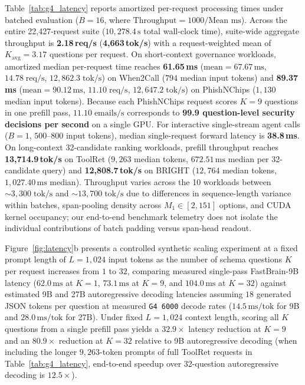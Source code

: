 \documentclass[10pt,twocolumn]{article}
\begin{document}
Table~\ref{tab:g4_latency} reports amortized per-request processing times under batched evaluation ($B = 16$, where $\text{Throughput} = 1000 / \text{Mean ms}$). Across the entire 22,427-request suite ($10{,}278.4\,\text{s}$ total wall-clock time), suite-wide aggregate throughput is \textbf{2.18\,req/s} (\textbf{4,663\,tok/s}) with a request-weighted mean of $K_{\text{avg}} = 3.17$ questions per request. On short-context governance workloads, amortized median per-request time reaches \textbf{61.65\,ms} ($\text{mean} = 67.67\,\text{ms}$, $14.78\;\text{req/s}$, $12{,}862.3\;\text{tok/s}$) on When2Call ($794$ median input tokens) and \textbf{89.37\,ms} ($\text{mean} = 90.12\,\text{ms}$, $11.10\;\text{req/s}$, $12{,}647.2\;\text{tok/s}$) on PhishNChips ($1{,}130$ median input tokens). Because each PhishNChips request scores $K = 9$ questions in one prefill pass, $11.10\;\text{emails/s}$ corresponds to \textbf{99.9 question-level security decisions per second} on a single GPU. For interactive single-stream agent calls ($B = 1$, $500\text{--}800$ input tokens), median single-request forward latency is \textbf{38.8\,ms}. On long-context 32-candidate ranking workloads, prefill throughput reaches \textbf{13,714.9\,tok/s} on ToolRet ($9{,}263$ median tokens, $672.51\,\text{ms}$ median per 32-candidate query) and \textbf{12,808.7\,tok/s} on BRIGHT ($12{,}764$ median tokens, $1{,}027.40\,\text{ms}$ median). Throughput varies across the 10 workloads between $\sim 3{,}300\;\text{tok/s}$ and $\sim 13{,}700\;\text{tok/s}$ due to differences in sequence-length variance within batches, span-pooling density across $M_1 \in [2, 151]$ options, and CUDA kernel occupancy; our end-to-end benchmark telemetry does not isolate the individual contributions of batch padding versus span-head readout.

Figure~\ref{fig:latency}b presents a controlled synthetic scaling experiment at a fixed prompt length of $L = 1{,}024$ input tokens as the number of schema questions $K$ per request increases from $1$ to $32$, comparing measured single-pass FastBrain-9B latency ($62.0\,\text{ms}$ at $K=1$, $73.1\,\text{ms}$ at $K=9$, and $104.0\,\text{ms}$ at $K=32$) against estimated 9B and 27B autoregressive decoding latencies assuming $18$ generated JSON tokens per question at measured \texttt{G4 6000} decode rates ($14.5\,\text{ms/tok}$ for 9B and $28.0\,\text{ms/tok}$ for 27B). Under fixed $L = 1{,}024$ context length, scoring all $K$ questions from a single prefill pass yields a $32.9\times$ latency reduction at $K = 9$ and an $80.9\times$ reduction at $K = 32$ relative to 9B autoregressive decoding (when including the longer $9{,}263$-token prompts of full ToolRet requests in Table~\ref{tab:g4_latency}, end-to-end speedup over 32-question autoregressive decoding is $12.5\times$).
\end{document}
